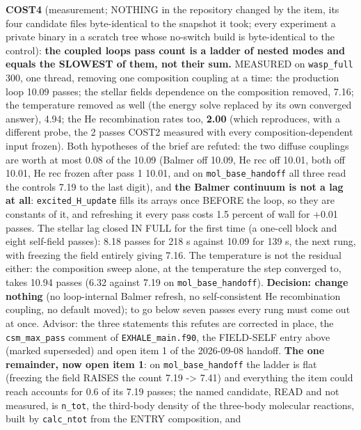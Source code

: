 \documentclass[english,a4paper]{my_memo}
\begin{document}
\begin{itemize}
  \textbf{COST4} (measurement; NOTHING in the repository changed by the item, its
  four candidate files byte-identical to the snapshot it took; every
  experiment a private binary in a scratch tree whose no-switch build is
  byte-identical to the control): \textbf{the coupled loop\textquotesingle s pass count is a
  ladder of nested modes and equals the SLOWEST of them, not their sum.}
  MEASURED on \texttt{wasp\_full} 300, one thread, removing one composition coupling
  at a time: the production loop 10.09 passes; the stellar field\textquotesingle s
  dependence on the composition removed, 7.16; the temperature removed as
  well (the energy solve replaced by its own converged answer), 4.94; the He
  recombination rates too, \textbf{2.00} (which reproduces, with a different
  probe, the 2 passes COST2 measured with every composition-dependent input
  frozen). Both hypotheses of the brief are refuted: the two diffuse
  couplings are worth at most 0.08 of the 10.09 (Balmer off 10.09, He rec
  off 10.01, both off 10.01, He rec frozen after pass 1 10.01, and on
  \texttt{mol\_base\_handoff} all three read the control\textquotesingle s 7.19 to the last digit),
  and \textbf{the Balmer continuum is not a lag at all}: \texttt{excited\_H\_update} fills
  its arrays once BEFORE the loop, so they are constants of it, and
  refreshing it every pass costs 1.5 percent of wall for +0.01 passes. The
  stellar lag closed IN FULL for the first time (a one-cell block and eight
  self-field passes): 8.18 passes for 218 s against 10.09 for 139 s, the
  next rung, with freezing the field entirely giving 7.16. The temperature
  is not the residual either: the composition sweep alone, at the
  temperature the step converged to, takes 10.94 passes (6.32 against 7.19
  on \texttt{mol\_base\_handoff}). \textbf{Decision: change nothing} (no loop-internal
  Balmer refresh, no self-consistent He recombination coupling, no default
  moved); to go below seven passes every rung must come out at once.
  Advisor: the three statements this refutes are corrected in place, the
  \texttt{csm\_max\_pass} comment of \texttt{EXHALE\_main.f90}, the FIELD-SELF entry above
  (marked superseded) and open item 1 of the 2026-09-08 handoff. \textbf{The one
  remainder, now open item 1}: on \texttt{mol\_base\_handoff} the ladder is flat
  (freezing the field RAISES the count 7.19 -\textgreater{} 7.41) and everything the item
  could reach accounts for 0.6 of its 7.19 passes; the named candidate, READ
  and not measured, is \texttt{n\_tot}, the third-body density of the three-body
  molecular reactions, built by \texttt{calc\_ntot} from the ENTRY composition, and

\end{itemize}
\end{document}
